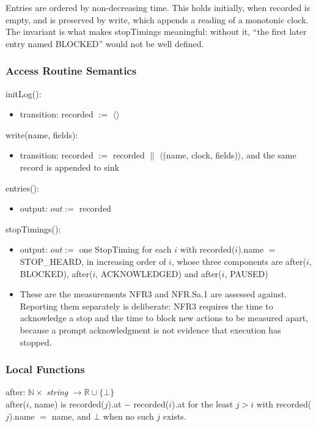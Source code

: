 \documentclass[12pt, titlepage]{article}
\newcommand{\str}{\textit{string}}
\newcommand{\R}{\mathbb{R}}
\newcommand{\N}{\mathbb{N}}
\newcommand{\nil}{\bot}
\begin{document}
\noindent Entries are ordered by non-decreasing time. This holds initially,
when recorded is empty, and is preserved by write, which appends a reading of a
monotonic clock. The invariant is what makes stopTimings meaningful: without it,
``the first later entry named BLOCKED'' would not be well defined.

\subsubsection{Access Routine Semantics}

\noindent initLog():
\begin{itemize}
\item transition: recorded $:=$ $\langle\rangle$
\end{itemize}

\noindent write(name, fields):
\begin{itemize}
\item transition: recorded $:=$ recorded $\|$ $\langle$(name, clock,
fields)$\rangle$, and the same record is appended to sink
\end{itemize}

\noindent entries():
\begin{itemize}
\item output: $out :=$ recorded
\end{itemize}

\noindent stopTimings():
\begin{itemize}
\item output: $out :=$ one StopTiming for each $i$ with recorded($i$).name $=$
STOP\_HEARD, in increasing order of $i$, whose three components are after($i$,
BLOCKED), after($i$, ACKNOWLEDGED) and after($i$, PAUSED)
\item These are the measurements NFR3 and NFR.Sa.1 are assessed against.
Reporting them separately is deliberate: NFR3 requires the time to acknowledge a
stop and the time to block new actions to be measured apart, because a prompt
acknowledgment is not evidence that execution has stopped.
\end{itemize}

\subsubsection{Local Functions}

\noindent after: $\N \times$ \str{} $\to \R \cup \{\nil\}$\\
after($i$, name) is recorded($j$).at $-$ recorded($i$).at for the least $j > i$
with recorded($j$).name $=$ name, and $\nil$ when no such $j$ exists.
\end{document}
